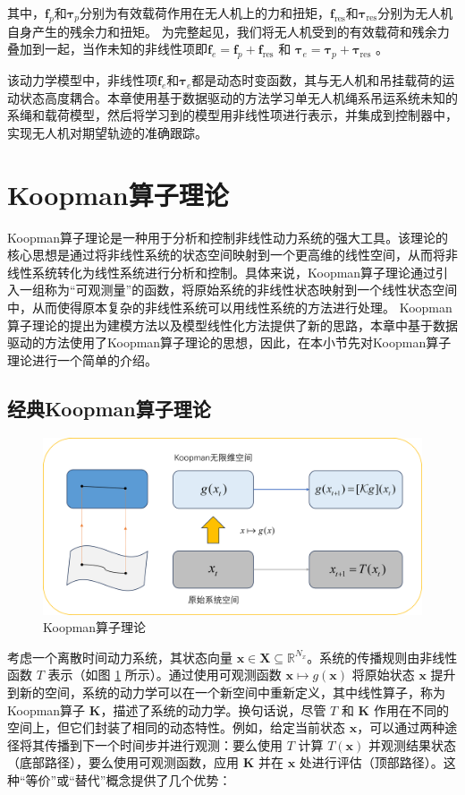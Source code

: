 \documentclass[lang=chs, degree=master, blindreview=false, winfonts=true]{yanputhesis}
\begin{document}
其中，$\bm{f}_p$和$\bm{\tau}_p$分别为有效载荷作用在无人机上的力和扭矩，$\bm{f}_\text{res}$和$\bm{\tau}_\text{res}$分别为无人机自身产生的残余力和扭矩。
为完整起见，我们将无人机受到的有效载荷和残余力叠加到一起，当作未知的非线性项即$\bm f_e = \bm f_p+ \bm f_{\text{res}}$ 和 $\bm \tau_e = \bm \tau_p+\bm \tau_{\text{res}}$ 。
	
该动力学模型中，非线性项$\bm f_e$和$\bm \tau_e$都是动态时变函数，其与无人机和吊挂载荷的运动状态高度耦合。本章使用基于数据驱动的方法学习单无人机绳系吊运系统未知的系绳和载荷模型，然后将学习到的模型用非线性项进行表示，并集成到控制器中，实现无人机对期望轨迹的准确跟踪。 




\section{Koopman算子理论}

Koopman算子理论是一种用于分析和控制非线性动力系统的强大工具\cite{1931Hamiltonian}。该理论的核心思想是通过将非线性系统的状态空间映射到一个更高维的线性空间，从而将非线性系统转化为线性系统进行分析和控制。具体来说，Koopman算子理论通过引入一组称为“可观测量”的函数，将原始系统的非线性状态映射到一个线性状态空间中，从而使得原本复杂的非线性系统可以用线性系统的方法进行处理。
Koopman算子理论的提出为建模方法以及模型线性化方法提供了新的思路，本章中基于数据驱动的方法使用了Koopman算子理论的思想，因此，在本小节先对Koopman算子理论进行一个简单的介绍。

\subsection{经典Koopman算子理论}
\begin{figure}[hbt!]
	\centering
	\includegraphics[width=34pc]{picture/3_1.png} 
	\caption{Koopman算子理论} \label{3_1}
\end{figure}
考虑一个离散时间动力系统，其状态向量 \( \bm x \in \mathcal{\bm X} \subseteq \mathbb{R}^{N_x} \)。系统的传播规则由非线性函数 \( T \) 表示（如图 \ref{3_1} 所示）。通过使用可观测函数 \( \bm x \mapsto g(\bm x) \) 将原始状态 \( \bm x \) 提升到新的空间，系统的动力学可以在一个新空间中重新定义，其中线性算子，称为Koopman算子 \( \mathcal{\bm K} \)，描述了系统的动力学。换句话说，尽管 \( T \) 和 \( \mathcal{\bm K} \) 作用在不同的空间上，但它们封装了相同的动态特性。例如，给定当前状态 \( \bm x \)，可以通过两种途径将其传播到下一个时间步并进行观测：要么使用 \( T \) 计算 \( T(\bm x) \) 并观测结果状态（底部路径），要么使用可观测函数，应用 \( \mathcal{\bm K} \) 并在 \( \bm x \) 处进行评估（顶部路径）。这种“等价”或“替代”概念提供了几个优势：
\end{document}
